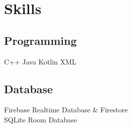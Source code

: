 \documentclass[]{deedy-resume-openfont}
\begin{document}
\begin{minipage}[t]{0.33\textwidth}




\section{Skills}
\subsection{Programming}
C++ \textbullet{} Java \textbullet{}  Kotlin \textbullet{} XML\\
\sectionsep
\subsection{Database}
 Firebase Realtime Database \& Firestore\\ \textbullet{} SQLite \textbullet{} Room Database 
 \sectionsep

\end{minipage}
\end{document}
